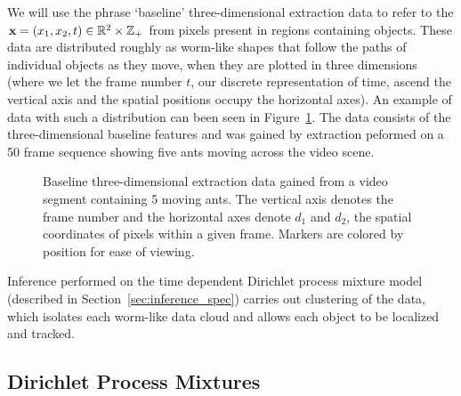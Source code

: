\documentclass[smallcondensed, final]{svjour3}
\begin{document}
We will use the phrase `baseline' three-dimensional extraction data to refer to the $\bold{x} = ( x_{1}, x_{2}, t ) \in \mathbb{R}^{2} \times \mathbb{Z}_{+}$ from pixels present in regions containing objects. These data are distributed roughly as worm-like shapes that follow the paths of individual objects as they move, when they are plotted in three dimensions (where we let the frame number $t$, our discrete representation of time, ascend the vertical axis and the spatial positions occupy the horizontal axes). An example of data with such a distribution can been seen in Figure~\ref{fig:baselinedata}. The data consists of the three-dimensional baseline features and was gained by extraction peformed on a 50 frame sequence showing five ants moving across the video scene.
\begin{figure}[h]
        \caption{\label{fig:baselinedata} Baseline three-dimensional extraction data gained from a video segment containing 5 moving ants. The vertical axis denotes the frame number and the horizontal axes denote $d_{1}$ and $d_{2}$, the spatial coordinates of pixels within a given frame. Markers are colored by position for ease of viewing.}
\end{figure}
Inference performed on the time dependent Dirichlet process mixture model (described in Section~\ref{sec:inference_spec}) carries out clustering of the data, which isolates each worm-like data cloud and allows each object to be localized and tracked.






\subsection{Dirichlet Process Mixtures}
\end{document}
